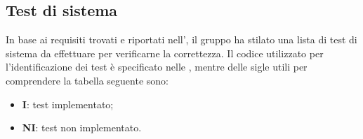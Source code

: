 \subsection{Test di sistema}
In base ai requisiti trovati e riportati nell'\AdRv{}, il gruppo ha stilato una lista di test di sistema da effettuare per verificarne la correttezza.
Il codice utilizzato per l'identificazione dei test è specificato nelle \NdPv{}, mentre delle sigle utili per comprendere la tabella seguente sono:
\begin{itemize}
	\item \textbf{I}: test implementato;
	\item \textbf{NI}: test non implementato.
\end{itemize} 

\newpage
\renewcommand{\arraystretch}{1.5}
\renewcommand\extrarowheight{1.5pt}
